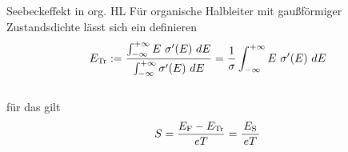\begin{frame}{Seebeckeffekt in org. HL}%
Für organische Halbleiter mit gaußförmiger Zustandsdichte lässt sich ein \Et definieren
\vspace*{4ex}
\begin{equation*}
\Et :=  \frac
{ \int_{-\infty} ^{+\infty} E ~ \c'(E) ~ dE }
{ \int_{-\infty} ^{+\infty} \c'(E) ~ dE }
= \frac{1}{\c} \int_{-\infty} ^{+\infty} E  ~ \c'(E) ~ dE
\end{equation*}
\\\vspace*{2.5ex}
für das gilt
\vspace*{3ex}
\begin{equation*}
\S = \frac{\Ef-\Et}{e T} = \frac{\,\Es\,}{e T} %
\end{equation*}
\end{frame}

